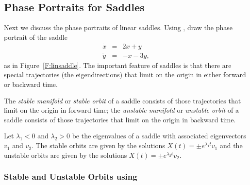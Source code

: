 \documentclass{ximera}
\begin{document}
\subsection*{Phase Portraits for Saddles}

Next we discuss the phase portraits of linear saddles.  Using
{\pplane}, draw the phase portrait
of the saddle
\begin{equation}  \label{e:saddlet}
\begin{array}{rcl}
\dot{x} & = & 2x+y\\
\dot{y} & = & -x-3y,
\end{array}
\end{equation}
as in Figure~\ref{F:linsaddle}.  The important feature of saddles
is that there are special trajectories (the eigendirections) that
limit on the origin in either forward or backward time.

\begin{figure*}[htb]
           \centerline{%
           }
           \caption{(Left) Saddle phase portrait.
	(Right) First quadrant solution time series.}
           \label{F:linsaddle}
\end{figure*}

\begin{definition} \label{D:stablemfld}
The {\em stable manifold\/} or {\em stable orbit\/} of a saddle consists of
those trajectories that limit on the origin in forward time; the
{\em unstable manifold\/} or {\em unstable orbit\/} of a saddle consists of
those trajectories that limit on the origin in backward time.
\end{definition}
 
 

Let $\lambda_1<0$ and $\lambda_2>0$ be the eigenvalues of a saddle with
associated eigenvectors $v_1$ and $v_2$.  The stable orbits are given by the
solutions $X(t) = \pm e^{\lambda_1 t}v_1$ and the unstable orbits are given
by the solutions $X(t) = \pm e^{\lambda_2 t}v_2$.

\subsubsection*{Stable and Unstable Orbits using {\pplane}}
\end{document}
